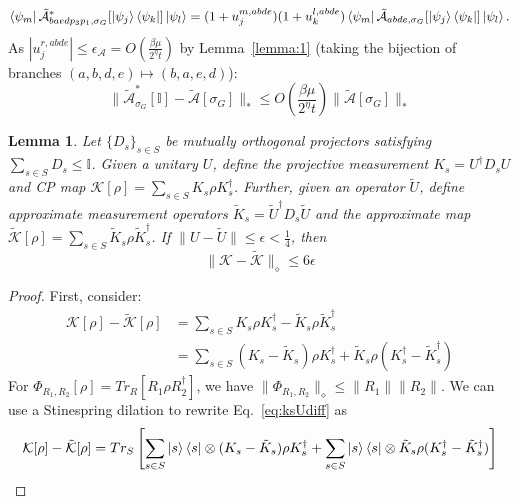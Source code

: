 \documentclass[aps,floatfix,10pt,amssymb,amsfont,amsmath,superscriptaddress,float,nofootinbib,longbibliography,nobalancelastpage,twocolumn]{revtex4-2}
\newtheorem{lemma}{Lemma}
\begin{document}
\begin{widetext}
\begin{equation}
   \bra{\psi_m}\tilde{\mathcal{A}}^*_{baedp_3p_1,\sigma_G}[\ket{\psi_j}\bra{\psi_k}]\ket{\psi_l}
   =(1+u_j^{m,abde})(1+u_k^{l,abde})\bra{\psi_m}\tilde{\mathcal{A}}_{abde,\sigma_G}[\ket{\psi_j}\bra{\psi_k}]\ket{\psi_l}.
\end{equation}
As $|u_j^{r,abde}| \leq \epsilon_{\mathcal{A}} = O(\frac{\beta \mu}{2^{\eta}t})$ by Lemma~\ref{lemma:1} (taking the bijection of branches $(a,b,d,e) \mapsto (b,a,e,d)$):
\begin{equation}
    \|\tilde{\mathcal{A}}^*_{\sigma_G}[\mathbb{I}] - \tilde{\mathcal{A}}[\sigma_G]\|_* \leq O\left(\frac{\beta \mu}{2^{\eta}t}\right)\|\tilde{\mathcal{A}}[\sigma_G]\|_*
    \label{eq:Aoutput}
\end{equation}

\begin{lemma}
\label{lemma:3}
Let $\{D_s\}_{s\in S}$ be mutually orthogonal projectors satisfying $\sum_{s\in S} D_s \leq \mathbb{I}$. Given a unitary $U$, define the projective measurement $K_s = U^{\dagger}D_s U$ and CP map $\mathcal{K}[\rho] = \sum_{s \in S} K_s\rho K_s^{\dagger}$. Further, given an operator $\tilde U$, define approximate measurement operators $\tilde K_s = \tilde U^{\dagger}D_s \tilde U$ and the approximate map $\tilde{\mathcal{K}}[\rho] = \sum_{s \in S} \tilde K_s\rho \tilde K_s^{\dagger}$. If $\|U-\tilde U\| \leq \epsilon<\frac14$, then 
\begin{equation}
    \|\mathcal{K} - \tilde{\mathcal{K}}\|_{\diamond} \leq 6\epsilon
\end{equation}
\end{lemma}
\begin{proof}
First, consider:
\begin{align}
    \mathcal{K}[\rho] - \tilde{\mathcal{K}}[\rho] &= \sum_{s \in S} K_s\rho K_s^{\dagger} - \tilde K_s\rho \tilde K_s^{\dagger} \\
    &= \sum_{s \in S} (K_s-\tilde K_s)\rho K_s^{\dagger} +\tilde K_s\rho (K_s^{\dagger}- \tilde K_s^{\dagger}) \label{eq:ksUdiff}
\end{align}
For $\Phi_{R_1,R_2}[\rho] = Tr_R[R_{1}\rho R_{2}^{\dagger}]$, we have $\|\Phi_{R_1,R_2}\|_{\diamond} \leq \|R_1\| \|R_2\|$. We can use a Stinespring dilation to rewrite Eq.~\eqref{eq:ksUdiff} as
\begin{equation}
    \mathcal{K}[\rho] - \tilde{\mathcal{K}}[\rho] = Tr_S\left[\sum_{s\in S}\ket{s}\bra{s}\otimes(K_s-\tilde K_s)\rho K_s^{\dagger} +\sum_{s\in S}\ket{s}\bra{s}\otimes \tilde K_s\rho (K_s^{\dagger}- \tilde K_s^{\dagger})\right]
\end{equation}

\end{proof}
\end{widetext}
\end{document}
